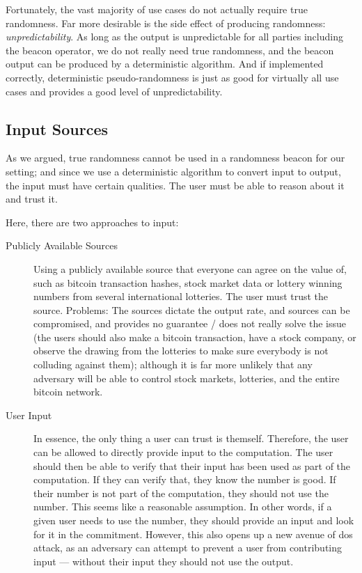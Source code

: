 Fortunately, the vast majority of use cases do not actually require true randomness.
Far more desirable is the side effect of producing randomness: \emph{unpredictability}.
As long as the output is unpredictable for all parties including the beacon operator, we do not really need true randomness, and the beacon output can be produced by a deterministic algorithm.
And if implemented correctly, deterministic pseudo-randomness is just as good for virtually all use cases and provides a good level of unpredictability.

\subsection{Input Sources}
As we argued, true randomness cannot be used in a randomness beacon for our setting;
and since we use a deterministic algorithm to convert input to output, the input must have certain qualities.
The user must be able to reason about it and trust it.

Here, there are two approaches to input:

\begin{description}
    \item[Publicly Available Sources] Using a publicly available source that everyone can agree on the value of, such as bitcoin transaction hashes, stock market data or lottery winning numbers from several international lotteries.
The user must trust the source.
Problems: The sources dictate the output rate, and sources can be compromised, and provides no guarantee / does not really solve the issue (the users should also make a bitcoin transaction, have a stock company, or observe the drawing from the lotteries to make sure everybody is not colluding against them); although it is far more unlikely that any adversary will be able to control stock markets, lotteries, and the entire bitcoin network.


    \item[User Input] In essence, the only thing a user can trust is themself.
Therefore, the user can be allowed to directly provide input to the computation.
The user should then be able to verify that their input has been used as part of the computation.
If they can verify that, they know the number is good.
If their number is not part of the computation, they should not use the number.
This seems like a reasonable assumption. 
In other words, if a given user needs to use the number, they should provide an input and look for it in the commitment.
However, this also opens up a new avenue of \gls{dos} attack, as an adversary can attempt to prevent a user from contributing input --- without their input they should not use the output.  
\end{description}

